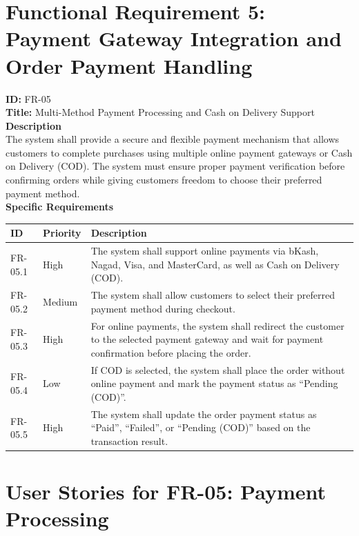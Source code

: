 
\section{Functional Requirement 5: Payment Gateway Integration and Order Payment Handling
}

\textbf{ID:} FR-05 \\
\textbf{Title:} Multi-Method Payment Processing and Cash on Delivery Support\\
\textbf{Description}\\
The system shall provide a secure and flexible payment mechanism that allows customers to complete purchases using multiple online payment gateways or Cash on Delivery (COD). The system must ensure proper payment verification before confirming orders while giving customers freedom to choose their preferred payment method.\\
\textbf{Specific Requirements}

\begin{table}[H]
\centering
\label{tab:payment-requirements}
\begin{tabular}{>{\raggedright\arraybackslash}p{2cm}>{\centering\arraybackslash}p{2cm}>{\raggedright\arraybackslash}p{10cm}}
\toprule
\textbf{ID} & \textbf{Priority} & \textbf{Description} \\
\midrule
FR-05.1 & High & The system shall support online payments via bKash, Nagad, Visa, and MasterCard, as well as Cash on Delivery (COD). \\
\midrule
FR-05.2 & Medium & The system shall allow customers to select their preferred payment method during checkout. \\
\midrule
FR-05.3 & High & For online payments, the system shall redirect the customer to the selected payment gateway and wait for payment confirmation before placing the order. \\
\midrule
FR-05.4 & Low & If COD is selected, the system shall place the order without online payment and mark the payment status as ``Pending (COD)''. \\
\midrule
FR-05.5 & High & The system shall update the order payment status as ``Paid'', ``Failed'', or ``Pending (COD)'' based on the transaction result. \\
\bottomrule
\end{tabular}
\end{table}

\section*{User Stories for FR-05: Payment Processing}

